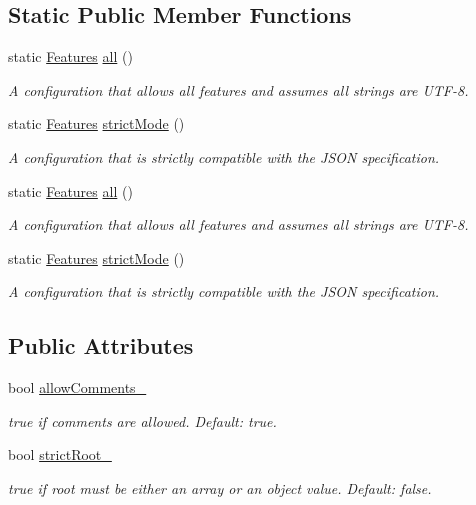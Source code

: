 \subsection*{Static Public Member Functions}
\begin{DoxyCompactItemize}
\item 
static \hyperlink{classJson_1_1Features}{Features} \hyperlink{classJson_1_1Features_a9f17db1b4ebbef8c645825344959481b}{all} ()
\begin{DoxyCompactList}\small\item\em A configuration that allows all features and assumes all strings are U\-T\-F-\/8. \end{DoxyCompactList}\item 
static \hyperlink{classJson_1_1Features}{Features} \hyperlink{classJson_1_1Features_aed3a2845df0cfd2ebe7338442361bd13}{strict\-Mode} ()
\begin{DoxyCompactList}\small\item\em A configuration that is strictly compatible with the J\-S\-O\-N specification. \end{DoxyCompactList}\item 
static \hyperlink{classJson_1_1Features}{Features} \hyperlink{classJson_1_1Features_a9f17db1b4ebbef8c645825344959481b}{all} ()
\begin{DoxyCompactList}\small\item\em A configuration that allows all features and assumes all strings are U\-T\-F-\/8. \end{DoxyCompactList}\item 
static \hyperlink{classJson_1_1Features}{Features} \hyperlink{classJson_1_1Features_aed3a2845df0cfd2ebe7338442361bd13}{strict\-Mode} ()
\begin{DoxyCompactList}\small\item\em A configuration that is strictly compatible with the J\-S\-O\-N specification. \end{DoxyCompactList}\end{DoxyCompactItemize}
\subsection*{Public Attributes}
\begin{DoxyCompactItemize}
\item 
bool \hyperlink{classJson_1_1Features_a33afd389719624b6bdb23950b3c346c9}{allow\-Comments\-\_\-}
\begin{DoxyCompactList}\small\item\em {\ttfamily true} if comments are allowed. Default\-: {\ttfamily true}. \end{DoxyCompactList}\item 
bool \hyperlink{classJson_1_1Features_a1162c37a1458adc32582b585b552f9c3}{strict\-Root\-\_\-}
\begin{DoxyCompactList}\small\item\em {\ttfamily true} if root must be either an array or an object value. Default\-: {\ttfamily false}. \end{DoxyCompactList}\end{DoxyCompactItemize}


